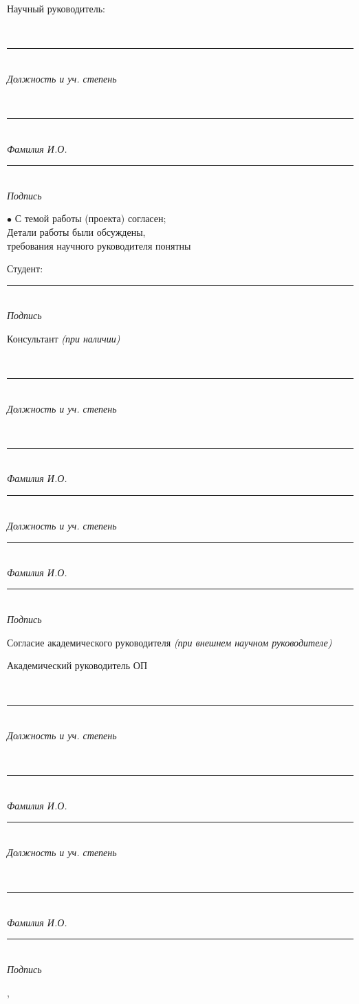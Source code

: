 \documentclass[12pt,a4paper]{article}
\newcommand{\hseSignField}[2]{%
  \begin{minipage}[t]{#1}\centering
    \rule{\linewidth}{0.4pt}\\[-2pt]{\footnotesize\itshape #2}
  \end{minipage}}
\newcommand{\hseFilledField}[3]{%
  \begin{minipage}[t]{#1}\centering
    {\small\strut #2}\\[-4pt]\rule{\linewidth}{0.4pt}\\[-2pt]{\footnotesize\itshape #3}
  \end{minipage}}
\begin{document}
\vspace{0.3cm}
\begin{minipage}[t]{0.27\textwidth}\raggedright Научный руководитель:\end{minipage}%
\hseFilledField{0.3\textwidth}{\hseSupervisorTitle\ifdefempty{\hseSupervisorDegree}{}{, \hseSupervisorDegree}}{Должность и уч. степень}\hfill
\hseFilledField{0.22\textwidth}{\hseSupervisorName}{Фамилия И.О.}\hfill
\hseSignField{0.15\textwidth}{Подпись}

\vspace{0.5cm}
\begin{minipage}[t]{0.55\textwidth}
$\bullet$ С темой работы (проекта) согласен;\\
Детали работы были обсуждены,\\
требования научного руководителя понятны
\end{minipage}\hfill
\begin{minipage}[t]{0.4\textwidth}
\vspace{0.5cm}
Студент: \hfill \hseSignField{0.5\textwidth}{Подпись}
\end{minipage}

\vspace{0.5cm}
\begin{minipage}[t]{0.27\textwidth}\raggedright Консультант {\itshape(при наличии)}\end{minipage}%
\ifhseHasCoSupervisor
\hseFilledField{0.3\textwidth}{\hseCoSupervisorTitle\ifdefempty{\hseCoSupervisorDegree}{}{, \hseCoSupervisorDegree}}{Должность и уч. степень}\hfill
\hseFilledField{0.22\textwidth}{\hseCoSupervisorName}{Фамилия И.О.}\hfill
\else
\hseSignField{0.3\textwidth}{Должность и уч. степень}\hfill
\hseSignField{0.22\textwidth}{Фамилия И.О.}\hfill
\fi
\hseSignField{0.15\textwidth}{Подпись}

\vspace{0.5cm}
\begin{minipage}[t]{0.27\textwidth}\raggedright Согласие академического руководителя {\itshape(при внешнем научном руководителе)}\end{minipage}%
\ifhseExternalSupervisor
\hseFilledField{0.3\textwidth}{Академический руководитель ОП}{Должность и уч. степень}\hfill
\hseFilledField{0.22\textwidth}{\hseAcademicSupervisorName}{Фамилия И.О.}\hfill
\else
\hseSignField{0.3\textwidth}{Должность и уч. степень}\hfill
\hseFilledField{0.22\textwidth}{\hseAcademicSupervisorName}{Фамилия И.О.}\hfill
\fi
\hseSignField{0.15\textwidth}{Подпись}

\vfill
\begin{center}\hseCity, \the\year\end{center}
\end{document}
